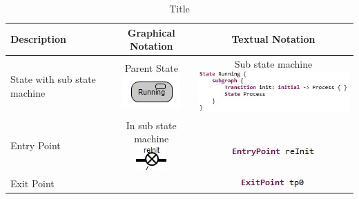 \begin{table}
\caption{Title}
\begin{tabular}{|b{3cm}|c|c|}
\hline
 \textbf{Description} & \textbf{Graphical Notation} & \textbf{Textual Notation} \\ \hline
 State with sub state machine & \specialcell{Parent State \\ 
\includegraphics[scale=0.7]{images/040-StateWithSubFSM.jpg}} & \specialcell{Sub state machine \\ 
\includegraphics[scale=0.5]{images/040-StateWithSubFSMTextual.jpg}} \\ \hline
 Entry Point & \specialcell{In sub state machine \\ 
\includegraphics[scale=0.7]{images/040-EntryPoint.jpg}} & \specialcell{ \\ 
\includegraphics{images/040-EntryPointTextual.jpg}} \\ \hline
 Exit Point & & \includegraphics{images/040-ExitPointTextual.jpg} \\ \hline
\end{tabular}
\end{table}



